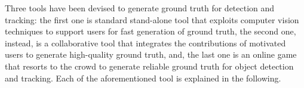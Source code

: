 Three tools have been devised to generate ground truth for detection and tracking: the first one is standard stand-alone tool that exploits computer vision techniques to support users for fast generation of ground truth, the second one, instead, is a collaborative tool that integrates the contributions of motivated users to generate high-quality ground truth, and, the last one is an online game that resorts to the crowd to generate reliable ground truth for object detection and tracking.
Each of the aforementioned tool is explained in the following.

